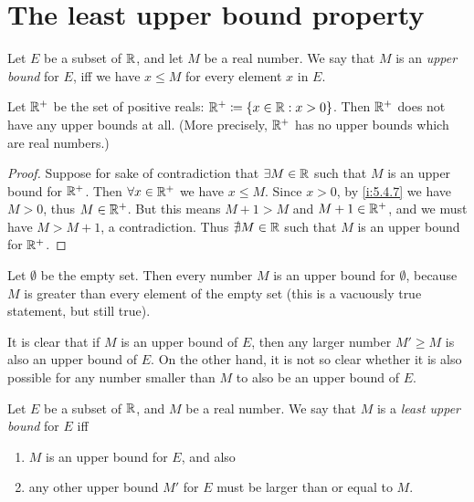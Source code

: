 \section{The least upper bound property}\label{i:sec:5.5}

\begin{defn}\label{i:5.5.1}
  Let \(E\) be a subset of \(\mathbb{R}\), and let \(M\) be a real number.
  We say that \(M\) is an \emph{upper bound} for \(E\), iff we have \(x \leq M\) for every element \(x\) in \(E\).
\end{defn}

\setcounter{thm}{2}
\begin{eg}\label{i:5.5.3}
  Let \(\mathbb{R}^+\) be the set of positive reals: \(\mathbb{R}^+ \coloneqq \left\lbrace x \in \mathbb{R} : x > 0\right\rbrace\).
  Then \(\mathbb{R}^+\) does not have any upper bounds at all.
  (More precisely, \(\mathbb{R}^+\) has no upper bounds which are real numbers.)
\end{eg}

\begin{proof}
  Suppose for sake of contradiction that \(\exists M \in \mathbb{R}\) such that \(M\) is an upper bound for \(\mathbb{R}^+\).
  Then \(\forall x \in \mathbb{R}^+\) we have \(x \leq M\).
  Since \(x > 0\), by \cref{i:5.4.7} we have \(M > 0\), thus \(M \in \mathbb{R}^+\).
  But this means \(M + 1 > M\) and \(M + 1 \in \mathbb{R}^+\), and we must have \(M > M + 1\), a contradiction.
  Thus \(\nexists M \in \mathbb{R}\) such that \(M\) is an upper bound for \(\mathbb{R}^+\).
\end{proof}

\begin{eg}\label{i:5.5.4}
  Let \(\emptyset\) be the empty set.
  Then every number \(M\) is an upper bound for \(\emptyset\), because \(M\) is greater than every element of the empty set
  (this is a vacuously true statement, but still true).
\end{eg}

\begin{note}
  It is clear that if \(M\) is an upper bound of \(E\), then any larger number \(M' \geq M\) is also an upper bound of \(E\).
  On the other hand, it is not so clear whether it is also possible for any number smaller than \(M\) to also be an upper bound of \(E\).
\end{note}

\begin{defn}\label{i:5.5.5}
  Let \(E\) be a subset of \(\mathbb{R}\), and \(M\) be a real number.
  We say that \(M\) is a \emph{least upper bound} for \(E\) iff
  \begin{enumerate}
    \item \(M\) is an upper bound for \(E\), and also
    \item any other upper bound \(M'\) for \(E\) must be larger than or equal to \(M\).
  \end{enumerate}
\end{defn}

